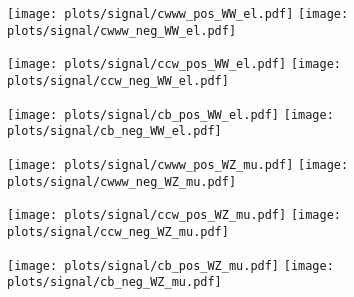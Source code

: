 \begin{figure}
	\centering
	\begin{subfigure}{\textwidth}
		\texttt{[image: plots/signal/cwww\_pos\_WW\_el.pdf]}
		\texttt{[image: plots/signal/cwww\_neg\_WW\_el.pdf]}
		\caption{}
	\end{subfigure}
	\begin{subfigure}{\textwidth}
		\texttt{[image: plots/signal/ccw\_pos\_WW\_el.pdf]}
		\texttt{[image: plots/signal/ccw\_neg\_WW\_el.pdf]}
		\caption{}
	\end{subfigure}
	\begin{subfigure}{\textwidth}
		\texttt{[image: plots/signal/cb\_pos\_WW\_el.pdf]}
		\texttt{[image: plots/signal/cb\_neg\_WW\_el.pdf]}
		\caption{}
	\end{subfigure}
	\caption[Fit result for the quadratic aTGC contribution in the WW-category, electron channel]{}
	\label{fig:signal:WW_el_sig}
\end{figure}

\begin{figure}
	\centering
	\begin{subfigure}{\textwidth}
		\texttt{[image: plots/signal/cwww\_pos\_WZ\_mu.pdf]}
		\texttt{[image: plots/signal/cwww\_neg\_WZ\_mu.pdf]}
		\caption{}
	\end{subfigure}
	\begin{subfigure}{\textwidth}
		\texttt{[image: plots/signal/ccw\_pos\_WZ\_mu.pdf]}
		\texttt{[image: plots/signal/ccw\_neg\_WZ\_mu.pdf]}
		\caption{}
	\end{subfigure}
	\begin{subfigure}{\textwidth}
		\texttt{[image: plots/signal/cb\_pos\_WZ\_mu.pdf]}
		\texttt{[image: plots/signal/cb\_neg\_WZ\_mu.pdf]}
		\caption{}
	\end{subfigure}
	\caption[Fit result for the quadratic aTGC contribution in the WZ-category, muon channel]{}
	\label{fig:signal:WZ_mu_sig}
\end{figure}
		
